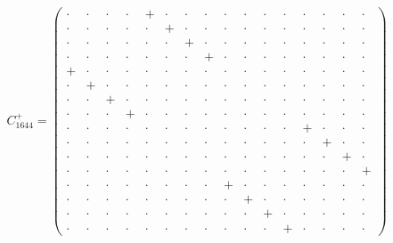 \documentclass[
  10pt,
]{article}
\begin{document}
\[C^+_{1644}=\left(\begin{smallmatrix} \cdot & \cdot & \cdot & \cdot & + & \cdot & \cdot & \cdot & \cdot & \cdot & \cdot & \cdot & \cdot & \cdot & \cdot & \cdot \\ \cdot & \cdot & \cdot & \cdot & \cdot & + & \cdot & \cdot & \cdot & \cdot & \cdot & \cdot & \cdot & \cdot & \cdot & \cdot \\ \cdot & \cdot & \cdot & \cdot & \cdot & \cdot & + & \cdot & \cdot & \cdot & \cdot & \cdot & \cdot & \cdot & \cdot & \cdot \\ \cdot & \cdot & \cdot & \cdot & \cdot & \cdot & \cdot & + & \cdot & \cdot & \cdot & \cdot & \cdot & \cdot & \cdot & \cdot \\ + & \cdot & \cdot & \cdot & \cdot & \cdot & \cdot & \cdot & \cdot & \cdot & \cdot & \cdot & \cdot & \cdot & \cdot & \cdot \\ \cdot & + & \cdot & \cdot & \cdot & \cdot & \cdot & \cdot & \cdot & \cdot & \cdot & \cdot & \cdot & \cdot & \cdot & \cdot \\ \cdot & \cdot & + & \cdot & \cdot & \cdot & \cdot & \cdot & \cdot & \cdot & \cdot & \cdot & \cdot & \cdot & \cdot & \cdot \\ \cdot & \cdot & \cdot & + & \cdot & \cdot & \cdot & \cdot & \cdot & \cdot & \cdot & \cdot & \cdot & \cdot & \cdot & \cdot \\ \cdot & \cdot & \cdot & \cdot & \cdot & \cdot & \cdot & \cdot & \cdot & \cdot & \cdot & \cdot & + & \cdot & \cdot & \cdot \\ \cdot & \cdot & \cdot & \cdot & \cdot & \cdot & \cdot & \cdot & \cdot & \cdot & \cdot & \cdot & \cdot & + & \cdot & \cdot \\ \cdot & \cdot & \cdot & \cdot & \cdot & \cdot & \cdot & \cdot & \cdot & \cdot & \cdot & \cdot & \cdot & \cdot & + & \cdot \\ \cdot & \cdot & \cdot & \cdot & \cdot & \cdot & \cdot & \cdot & \cdot & \cdot & \cdot & \cdot & \cdot & \cdot & \cdot & + \\ \cdot & \cdot & \cdot & \cdot & \cdot & \cdot & \cdot & \cdot & + & \cdot & \cdot & \cdot & \cdot & \cdot & \cdot & \cdot \\ \cdot & \cdot & \cdot & \cdot & \cdot & \cdot & \cdot & \cdot & \cdot & + & \cdot & \cdot & \cdot & \cdot & \cdot & \cdot \\ \cdot & \cdot & \cdot & \cdot & \cdot & \cdot & \cdot & \cdot & \cdot & \cdot & + & \cdot & \cdot & \cdot & \cdot & \cdot \\ \cdot & \cdot & \cdot & \cdot & \cdot & \cdot & \cdot & \cdot & \cdot & \cdot & \cdot & + & \cdot & \cdot & \cdot & \cdot \end{smallmatrix}\right)\]
\end{document}
